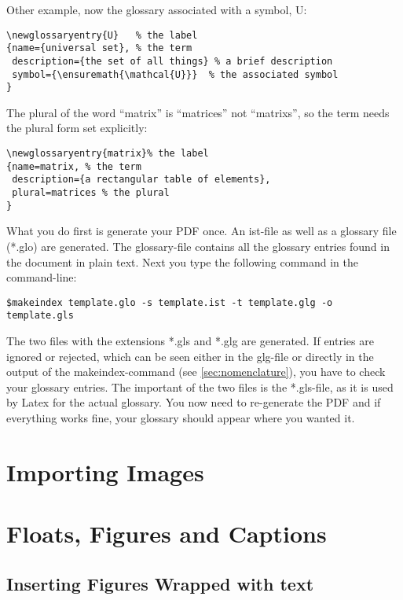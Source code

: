 Other example, now the glossary associated with a symbol, \gls{U}:

\begin{verbatim}
\newglossaryentry{U}   % the label
{name={universal set}, % the term
 description={the set of all things} % a brief description
 symbol={\ensuremath{\mathcal{U}}}  % the associated symbol 
}
 \end{verbatim}

The plural of the word ``\gls{matrix}'' is ``matrices'' not ``matrixs'', so the term needs the plural form set explicitly:

 \begin{verbatim}
\newglossaryentry{matrix}% the label
{name=matrix, % the term
 description={a rectangular table of elements}, 
 plural=matrices % the plural
}
 \end{verbatim}
 What you do first is generate your PDF once. An ist-file as well as a glossary file (*.glo) are generated. The glossary-file contains all the glossary entries found in the document in plain text. Next you type the following command in the command-line:
 \begin{verbatim}
$makeindex template.glo -s template.ist -t template.glg -o 
template.gls
 \end{verbatim}
The two files with the extensions *.gls and *.glg are generated. If entries are ignored or rejected, which can be seen either in the glg-file or directly in the output of the makeindex-command (see \ref{sec:nomenclature}), you have to check your glossary entries. The important of the two files is the *.gls-file, as it is used by Latex for the actual glossary. You now need to re-generate the PDF and if everything works fine, your glossary should appear where you wanted it.

\section{Importing Images} %
\label{sec:importing_images}


\section{Floats, Figures and Captions} %
\label{sec:floats_figures_and_captions}

 \subsection{Inserting Figures Wrapped with text} %
 \label{ssec:inserting_images_wrapped_with_text}
 
